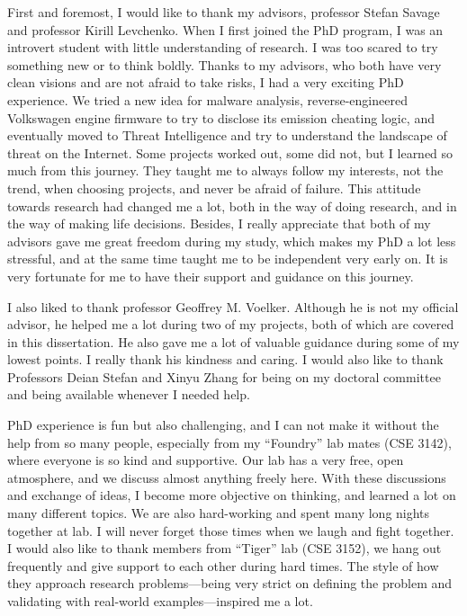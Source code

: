 \begin{acknowledgements}
First and foremost, I would like to thank my advisors, professor Stefan
Savage and professor Kirill Levchenko. When I first joined the PhD program,
I was an introvert student with little understanding of research. I was
too scared to try something new or to think boldly. Thanks to my advisors,
who both have very clean visions and are not afraid to take risks, I had a 
very exciting PhD experience. We tried a new idea for malware analysis, 
reverse-engineered Volkswagen engine firmware to try to disclose its emission 
cheating logic, and eventually moved to Threat Intelligence and try to understand 
the landscape of threat on the Internet. Some projects worked out, some did not, 
but I learned so much from this journey. They taught me to always follow my
interests, not the trend, when choosing projects, and never be afraid of 
failure. This attitude towards research had changed me a lot, both in the
way of doing research, and in the way of making life decisions. Besides, 
I really appreciate that both of my advisors gave me great freedom during
my study, which makes my PhD a lot less stressful, and at the same 
time taught me to be independent very early on. It is very fortunate for me to 
have their support and guidance on this journey.

I also liked to thank professor Geoffrey M. Voelker. Although he is not my
official advisor, he helped me a lot during two of my projects, both of 
which are covered in this dissertation. He also gave me a lot of valuable 
guidance during some of my lowest points. I really thank his kindness
and caring. I would also like to thank Professors Deian Stefan and Xinyu Zhang 
for being on my doctoral committee and being available whenever I needed help.

PhD experience is fun but also challenging, and I can not make it 
without the help from so many people, especially from my ``Foundry'' lab
mates (CSE 3142), where everyone is so kind and supportive.
Our lab has a very free, open atmosphere, and we discuss almost anything
freely here. With these discussions and exchange of ideas, I become 
more objective on thinking, and learned a lot on many different 
topics. We are also hard-working and spent many long nights together
at lab. I will never forget those times when we laugh and fight together. 
I would also like to thank members from ``Tiger'' lab (CSE 3152), we 
hang out frequently and give support to each other during hard times. The style 
of how they approach research problems---being very strict on defining the
problem and validating with real-world examples---inspired me a lot.


\end{acknowledgements}
